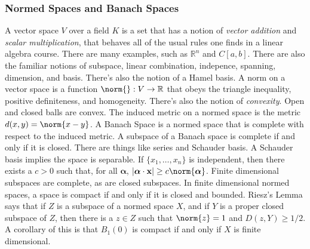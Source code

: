 \documentclass[crop=false,class=article,oneside]{standalone}
\begin{document}
        \subsubsection{Normed Spaces and Banach Spaces}
            A vector space $V$ over a field $K$ is a set that has
            a notion of \textit{vector addition} and
            \textit{scalar multiplication}, that behaves all of the
            usual rules one finds in a linear algebra course. There are
            many examples, such as $\mathbb{R}^{n}$ and $C[a,b]$.
            There are also the familiar notions of subspace,
            linear combination, indepence, spanning, dimension, and
            basis. There's also the notion of a Hamel basis. A norm on
            a vector space is a function $\norm{}:V\rightarrow\mathbb{R}$
            that obeys the triangle inequality, positive definiteness,
            and homogeneity. There's also the notion of
            \textit{convexity}. Open and closed balls are convex.
            The induced metric on a normed space is the metric
            $d(x,y)=\norm{x-y}$. A Banach Space is a normed space
            that is complete with respect to the induced metric.
            A subspace of a Banach space is complete if and only if
            it is closed. There are things like series and Schauder basis.
            A Schauder basis implies the space is separable. If
            $\{x_{1},\hdots,x_{n}\}$ is independent, then there exists
            a $c>0$ such that, for all $\boldsymbol{\alpha}$,
            $|\boldsymbol{\alpha}\cdot\mathbf{x}|%
             \geq{c}\norm{\boldsymbol{\alpha}}$.
            Finite dimensional subspaces are complete, as are closed
            subspaces. In finite dimensional normed spaces,
            a space is compact if and only if it is closed and bounded.
            Riesz's Lemma says that if $Z$ is a subspace of a normed
            space $X$, and if $Y$ is a proper closed subspace of
            $Z$, then there is a $z\in{Z}$ such that
            $\norm{z}=1$ and $D(z,Y)\geq{1/2}$. A corollary of this is
            that $B_{1}(0)$ is compact if and only if
            $X$ is finite dimensional.
\end{document}
